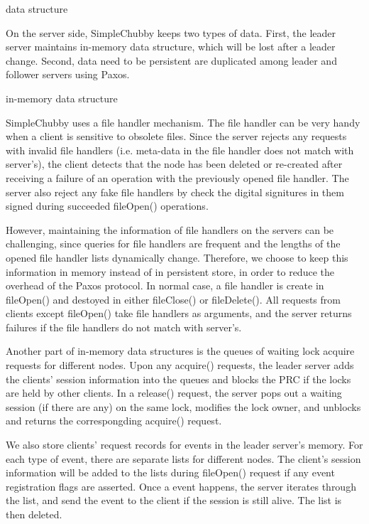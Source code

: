 data structure

On the server side, SimpleChubby keeps two types of data. First, the
leader server maintains in-memory data structure, which will be lost
after a leader change. Second, data need to be persistent are duplicated
among leader and follower servers using Paxos.



in-memory data structure

SimpleChubby uses a file handler mechanism. The file handler can be very
handy when a client is sensitive to obsolete files. Since the server
rejects any requests with invalid file handlers (i.e. meta-data in the file
handler does not match with server's), the client detects that the node has
been deleted or re-created after receiving a failure of an operation with
the previously opened file handler. The server also reject any fake file
handlers by check the digital signitures in them signed during succeeded
fileOpen() operations.

However, maintaining the information of file handlers on the servers can
be challenging, since queries for file handlers are frequent and the lengths
of the opened file handler lists dynamically change. Therefore, we choose
to keep this information in memory instead of in persistent store, in order
to reduce the overhead of the Paxos protocol. In normal case, a file handler
is create in fileOpen() and destoyed in either fileClose() or fileDelete().
All requests from clients except fileOpen() take file handlers as arguments,
and the server returns failures if the file handlers do not match with
server's.

Another part of in-memory data structures is the queues of waiting lock acquire
requests for different nodes. Upon any acquire() requests, the leader server
adds the clients' session information into the queues and blocks the PRC
if the locks are held by other clients.
In a release() request, the server pops out a waiting session
(if there are any) on the same lock, modifies the lock owner, and unblocks and
returns the correspongding acquire() request.

We also store clients' request records for events in the leader server's memory.
For each type of event, there are separate lists for different nodes.
The client's session information will be added to the lists during fileOpen()
request if any event registration flags are asserted. Once a event happens,
the server iterates through the list, and send the event to the client if the
session is still alive. The list is then deleted.



